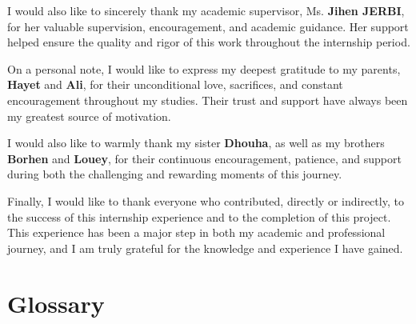 I would also like to sincerely thank my academic supervisor, Ms. \textbf{Jihen JERBI}, for her valuable supervision, encouragement, and academic guidance. Her support helped ensure the quality and rigor of this work throughout the internship period.
\vspace{1em}

On a personal note, I would like to express my deepest gratitude to my parents, \textbf{Hayet} and \textbf{Ali}, for their unconditional love, sacrifices, and constant encouragement throughout my studies. Their trust and support have always been my greatest source of motivation.
\vspace{1em}

I would also like to warmly thank my sister \textbf{Dhouha}, as well as my brothers \textbf{Borhen} and \textbf{Louey}, for their continuous encouragement, patience, and support during both the challenging and rewarding moments of this journey.
\vspace{1em}

Finally, I would like to thank everyone who contributed, directly or indirectly, to the success of this internship experience and to the completion of this project. This experience has been a major step in both my academic and professional journey, and I am truly grateful for the knowledge and experience I have gained.

\clearpage
{}
\thispagestyle{frontmatterplain}
\tableofcontents

\clearpage
{}
\thispagestyle{frontmatterplain}
\listoffigures

\clearpage
{}
\thispagestyle{frontmatterplain}
\listoftables

\clearpage
\section*{Glossary}
\thispagestyle{frontmatterplain}

\vspace{1.8cm}

